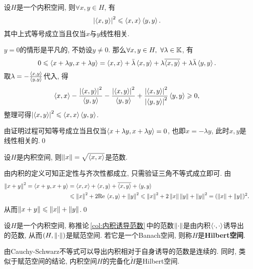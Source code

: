 	\begin{Theorem}
	设$ H $是一个内积空间, 则$ \forall x,y\in H $, 有
	\[
	\left| \left\langle x,y \right\rangle \right| ^2\leqslant\left\langle x,x \right\rangle\left\langle y,y \right\rangle.
	\]
	其中上式等号成立当且仅当$ x $与$ y $线性相关.
	\end{Theorem}
	\begin{Proof}
	$ y=0 $的情形是平凡的, 不妨设$ y\ne 0 $. 那么$ \forall x,y\in H,\ \forall\lambda\in\K $, 有
	\[
	0\leqslant\left\langle x+\lambda y,x+\lambda y \right\rangle=\left\langle x,x \right\rangle+\bar{\lambda}\left\langle x,y \right\rangle+\lambda\overline{\left\langle x,y \right\rangle}+\lambda\bar{\lambda}\left\langle y,y \right\rangle.
	\]
	取$ \lambda=-\frac{\left\langle x,y \right\rangle}{\left\langle y,y \right\rangle} $代入, 得
	\[
	\left\langle x,x \right\rangle-\frac{\left| \left\langle x,y \right\rangle \right| ^2}{\left\langle y,y \right\rangle}-\frac{\left| \left\langle x,y \right\rangle \right| ^2}{\left\langle y,y \right\rangle}+\frac{\left| \left\langle x,y \right\rangle \right| ^2}{\left| \left\langle y,y \right\rangle \right| ^2}\left\langle y,y \right\rangle\geqslant 0,
	\]
	整理可得$ \left| \left\langle x,y \right\rangle \right| ^2\leqslant\left\langle x,x \right\rangle\left\langle y,y \right\rangle $.
	
	由证明过程可知等号成立当且仅当$ \left\langle x+\lambda y,x+\lambda y \right\rangle=0 $, 也即$ x=-\lambda y $, 此时$ x,y $是线性相关的.\qed
	\end{Proof}
	
	\begin{Corollary}\label{col:内积诱导范数}
	设$ H $是内积空间, 则$ \left\| x \right\|=\sqrt{\left\langle x,x \right\rangle} $是范数.
	\end{Corollary}
	\begin{Proof}
	由内积的定义可知正定性与齐次性都成立, 只需验证三角不等式成立即可. 由
	\[
		\begin{aligned}
		\left\| x+y \right\|^2=\left\langle x+y,x+y \right\rangle&=\left\langle x,x \right\rangle+\left\langle x,y \right\rangle+\overline{\left\langle x,y \right\rangle}+\left\langle y,y \right\rangle\\
		&\leqslant\left\| x \right\|^2+2\mathrm{Re\,}\left\langle x,y \right\rangle+\left\| y \right\|^2\leqslant\left\| x \right\|^2+2\left\| x \right\|\left\| y \right\|+\left\| y \right\|^2=(\left\| x \right\|+\left\| y \right\|)^2.
		\end{aligned}
	\]
	从而$ \left\| x+y \right\|\leqslant\left\| x \right\|+\left\| y \right\| $.\qed
	\end{Proof}
	
	\begin{Definition}[Hilbert空间]\label{def:Hilbert空间}
	设$ H $是一个内积空间, 称推论\,\ref{col:内积诱导范数}\,中的范数$ \left\| \cdot \right\| $是由内积$ \left\langle \cdot,\cdot \right\rangle $诱导出的范数, 从而$ (H,\left\| \cdot \right\|) $是赋范空间. 若它是一个Banach空间, 则称$ H $是\textbf{Hilbert空间}.
	\end{Definition}
	
	由Cauchy-Schwarz不等式可以导出内积相对于自身诱导的范数是连续的. 同时, 类似于赋范空间的结论, 内积空间$ H $的完备化$ \tilde{H} $是Hilbert空间.
	
